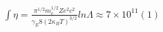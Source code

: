 $∫\eta=\frac{\pi^{1/2}m^{1/2}_{e}Ze^{2}c^{2}}{\gamma_{E}8(2\kappa_{B}T)^{3/2}} ln\Lambda\approx7×10^{11}      (1)$ \\


